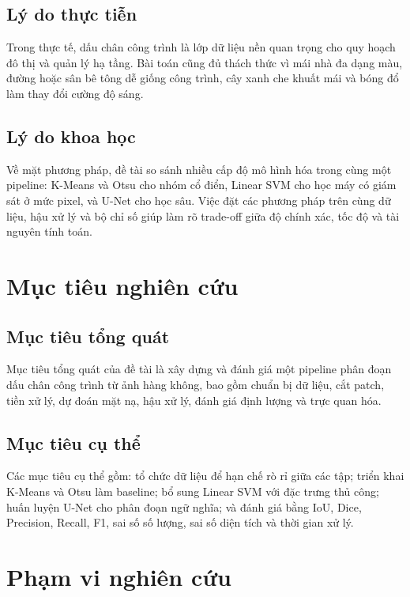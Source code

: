 \documentclass[12pt,a4paper]{report}
\begin{document}
\subsection*{Lý do thực tiễn}

Trong thực tế, dấu chân công trình là lớp dữ liệu nền quan trọng cho quy hoạch đô thị và quản lý hạ tầng. Bài toán cũng đủ thách thức vì mái nhà đa dạng màu, đường hoặc sân bê tông dễ giống công trình, cây xanh che khuất mái và bóng đổ làm thay đổi cường độ sáng.

\subsection*{Lý do khoa học}

Về mặt phương pháp, đề tài so sánh nhiều cấp độ mô hình hóa trong cùng một pipeline: K-Means và Otsu cho nhóm cổ điển, Linear SVM cho học máy có giám sát ở mức pixel, và U-Net cho học sâu. Việc đặt các phương pháp trên cùng dữ liệu, hậu xử lý và bộ chỉ số giúp làm rõ trade-off giữa độ chính xác, tốc độ và tài nguyên tính toán.

\section*{Mục tiêu nghiên cứu}

\subsection*{Mục tiêu tổng quát}

Mục tiêu tổng quát của đề tài là xây dựng và đánh giá một pipeline phân đoạn dấu chân công trình từ ảnh hàng không, bao gồm chuẩn bị dữ liệu, cắt patch, tiền xử lý, dự đoán mặt nạ, hậu xử lý, đánh giá định lượng và trực quan hóa.

\subsection*{Mục tiêu cụ thể}

Các mục tiêu cụ thể gồm: tổ chức dữ liệu để hạn chế rò rỉ giữa các tập; triển khai K-Means và Otsu làm baseline; bổ sung Linear SVM với đặc trưng thủ công; huấn luyện U-Net cho phân đoạn ngữ nghĩa; và đánh giá bằng IoU, Dice, Precision, Recall, F1, sai số số lượng, sai số diện tích và thời gian xử lý.

\section*{Phạm vi nghiên cứu}
\end{document}
